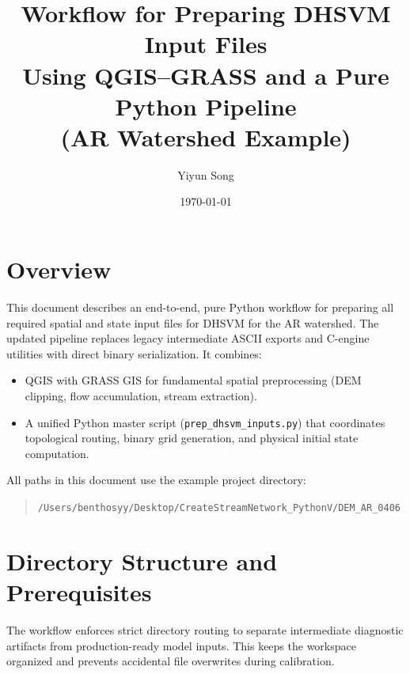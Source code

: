 \documentclass[11pt]{article}
\title{Workflow for Preparing DHSVM Input Files \\ Using QGIS--GRASS and a Pure Python Pipeline\\
\large (AR Watershed Example)}
\author{Yiyun Song}
\date{\today}
\begin{document}
\maketitle

\section{Overview}

This document describes an end-to-end, pure Python workflow for preparing all required spatial and state input files for DHSVM for the AR watershed. The updated pipeline replaces legacy intermediate ASCII exports and C-engine utilities with direct binary serialization. It combines:

\begin{itemize}
  \item QGIS with GRASS GIS for fundamental spatial preprocessing (DEM clipping, flow accumulation, stream extraction).
  \item A unified Python master script (\texttt{prep\_dhsvm\_inputs.py}) that coordinates topological routing, binary grid generation, and physical initial state computation.
\end{itemize}

All paths in this document use the example project directory:
\begin{quote}
\texttt{/Users/benthosyy/Desktop/CreateStreamNetwork\_PythonV/DEM\_AR\_0406}
\end{quote}

\section{Directory Structure and Prerequisites}

The workflow enforces strict directory routing to separate intermediate diagnostic artifacts from production-ready model inputs. This keeps the workspace organized and prevents accidental file overwrites during calibration.
\end{document}
